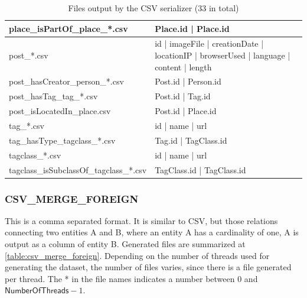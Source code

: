 \begin{table}[htbp]
\begin{tabular}{|p{4.6cm}|p{9.8cm}|}
    	place\_isPartOf\_place\_*.csv           & Place.id | Place.id                                                                     \\ \hline
    	post\_*.csv                             & id | imageFile | creationDate | locationIP | browserUsed | language | content | length  \\ \hline
    	post\_hasCreator\_person\_*.csv         & Post.id | Person.id                                                                     \\ \hline
    	post\_hasTag\_tag\_*.csv                & Post.id | Tag.id                                                                        \\ \hline
    	post\_isLocatedIn\_place.csv            & Post.id | Place.id                                                                      \\ \hline
    	tag\_*.csv                              & id | name | url                                                                         \\ \hline
    	tag\_hasType\_tagclass\_*.csv           & Tag.id | TagClass.id                                                                    \\ \hline
    	tagclass\_*.csv                         & id | name | url                                                                         \\ \hline
    	tagclass\_isSubclassOf\_tagclass\_*.csv & TagClass.id | TagClass.id                                                               \\ \hline
    \end{tabular}
    \caption{Files output by the CSV serializer (33 in total)}
    \label{table:csv}
\end{table}




\subsubsection{CSV\_MERGE\_FOREIGN}

This is a comma separated format. It is similar to CSV, but those relations
connecting two entities A and B, where an entity A has a cardinality of one, A
is output as a column of entity B. Generated files are summarized at
\autoref{table:csv_merge_foreign}. Depending on the number of threads used for generating
the dataset, the number of files varies, since there is a file generated per
thread. The * in the file names indicates a number between 0 and $\mathsf{NumberOfThreads}-1$.

